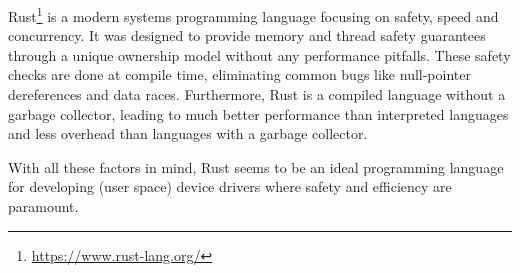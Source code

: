 Rust\footnote{\url{https://www.rust-lang.org/}} is a modern systems programming language focusing on safety, speed and concurrency. It was designed to provide memory and thread safety guarantees through a unique ownership model without any performance pitfalls. These safety checks are done at compile time, eliminating common bugs like null-pointer dereferences and data races. Furthermore, Rust is a compiled language without a garbage collector, leading to much better performance than interpreted languages and less overhead than languages with a garbage collector.

With all these factors in mind, Rust seems to be an ideal programming language for developing (user space) device drivers where safety and efficiency are paramount.


